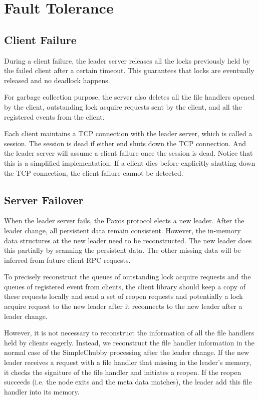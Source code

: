 \section{Fault Tolerance}
\label{section:failure}

\subsection{Client Failure}

During a client failure, the leader server releases all the locks
previously held by the failed client after a certain timeout.
This guarantees that locks are eventually released and no deadlock happens.

For garbage collection
purpose, the server also deletes all the file handlers opened by the client,
outstanding lock acquire requests sent by the client, and all the registered
events from the client.

Each client maintains a TCP connection with the leader server,
which is called a session.
The session is dead if either end shuts down the TCP connection.
And the leader server will assume a client failure once the session is dead.
Notice that this is a simplified implementation.
If a client dies before explicitly shutting down the TCP connection,
the client failure cannot be detected.

\subsection{Server Failover}

When the leader server fails, the Paxos protocol elects a new leader. After
the leader change, all persistent data remain consistent. However, the in-memory
data structures at the new leader need to be reconstructed. The new leader
does this partially by scanning the persistent data. The other missing data
will be inferred from future client RPC requests.

To precisely reconstruct the queues of outstanding lock acquire requests and
the queues of registered event from clients, the client library should keep
a copy of these requests locally and send a set of reopen requests and
potentially a lock acquire request to the new leader after it reconnects
to the new leader after a leader change.

However, it is not necessary to reconstruct the information of all the file
handlers held by clients eagerly. Instead, we reconstruct the file handler
information in the normal case of the SimpleChubby processing after the
leader change. If the new leader receives a request with a file handler that
missing in the leader's memory, it checks the signiture of the file
handler and initiates a reopen. If the reopen succeeds (i.e. the node exits
and the meta data matches), the leader add this file handler into its memory.
